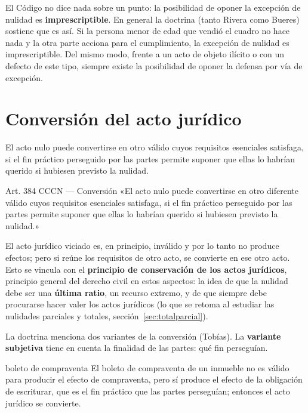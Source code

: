 \documentclass[12pt,oneside]{book}
\begin{document}
El Código no dice nada sobre un punto: la posibilidad de oponer la excepción de nulidad es \textbf{imprescriptible}. En general la doctrina (tanto Rivera como Bueres) sostiene que es así. Si la persona menor de edad que vendió el cuadro no hace nada y la otra parte acciona para el cumplimiento, la excepción de nulidad es imprescriptible. Del mismo modo, frente a un acto de objeto ilícito o con un defecto de este tipo, siempre existe la posibilidad de oponer la defensa por vía de excepción.

\section{Conversión del acto jurídico}
\label{sec:conversion}

El acto nulo puede convertirse en otro válido cuyos requisitos esenciales satisfaga, si el fin práctico perseguido por las partes permite suponer que ellas lo habrían querido si hubiesen previsto la nulidad.

\begin{articulo}{Art. 384 CCCN --- Conversión}
«El acto nulo puede convertirse en otro diferente válido cuyos requisitos esenciales satisfaga, si el fin práctico perseguido por las partes permite suponer que ellas lo habrían querido si hubiesen previsto la nulidad.»
\end{articulo}

El acto jurídico viciado es, en principio, inválido y por lo tanto no produce efectos; pero si reúne los requisitos de otro acto, se convierte en ese otro acto. Esto se vincula con el \textbf{principio de conservación de los actos jurídicos}, principio general del derecho civil en estos aspectos: la idea de que la nulidad debe ser una \textbf{última ratio}, un recurso extremo, y de que siempre debe procurarse hacer valer los actos jurídicos (lo que se retoma al estudiar las nulidades parciales y totales, sección~\ref{sec:totalparcial}).

La doctrina menciona dos variantes de la conversión (Tobías). La \textbf{variante subjetiva} tiene en cuenta la finalidad de las partes: qué fin perseguían.

\begin{example}{boleto de compraventa}
El boleto de compraventa de un inmueble no es válido para producir el efecto de compraventa, pero sí produce el efecto de la obligación de escriturar, que es el fin práctico que las partes perseguían; entonces el acto jurídico se convierte.
\end{example}
\end{document}
